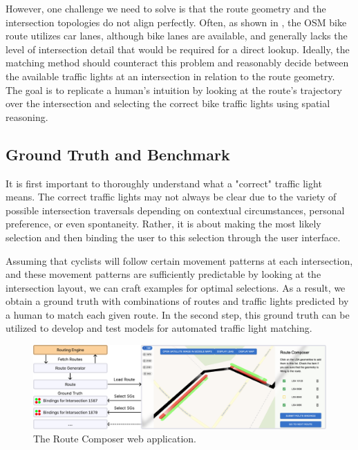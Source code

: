 However, one challenge we need to solve is that the route geometry and the intersection topologies do not align perfectly. Often, as shown in , the OSM bike route utilizes car lanes, although bike lanes are available, and generally lacks the level of intersection detail that would be required for a direct lookup. Ideally, the matching method should counteract this problem and reasonably decide between the available traffic lights at an intersection in relation to the route geometry. The goal is to replicate a human's intuition by looking at the route's trajectory over the intersection and selecting the correct bike traffic lights using spatial reasoning.

\subsection{Ground Truth and Benchmark}

It is first important to thoroughly understand what a "correct" traffic light means. The correct traffic lights may not always be clear due to the variety of possible intersection traversals depending on contextual circumstances, personal preference, or even spontaneity. Rather, it is about making the most likely selection and then binding the user to this selection through the user interface.

Assuming that cyclists will follow certain movement patterns at each intersection, and these movement patterns are sufficiently predictable by looking at the intersection layout, we can craft examples for optimal selections. As a result, we obtain a ground truth with combinations of routes and traffic lights predicted by a human to match each given route. In the second step, this ground truth can be utilized to develop and test models for automated traffic light matching.

\begin{figure}[htbp]
\centering
\includegraphics[width=\linewidth]{images/sg-selection-ground-truth.pdf}
\caption{The Route Composer web application.}
\label{fig:sg-selection-ground-truth}
\end{figure}

